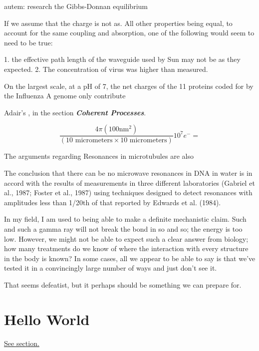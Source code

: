 \documentclass[paper.tex]{subfiles}
\begin{document}
\begin{autem}
	autem: research the Gibbs-Donnan equilibrium
\end{autem}









If we assume that the charge is not as. All other properties being equal, to account for the same coupling and absorption, one of the following would seem to need to be true:

1. the effective path length of the waveguide used by Sun may not be as they expected.
2. The concentration of virus was higher than measured.


On the largest scale, at a pH of 7, the net charges of the 11 proteins coded for by the Influenza A genome only contribute 







Adair's \cite{Vibrational2002}, in the section {\it \bf Coherent Processes}. 

$$\frac{4 \pi (100 \text{nm}^2)}{(10 \text{ micrometers} \times 10 \text{ micrometers})} 10^7 e^- = $$

The arguments regarding Resonances in microtubules are also 

\cite{Vibrational2002}
The conclusion that there can be no microwave resonances in DNA in water is in accord with the results of
measurements in three different laboratories (Gabriel et al.,
1987; Foster et al., 1987) using techniques designed to
detect resonances with amplitudes less than 1/20th of that
reported by Edwards et al. (1984).


In my field, I am used to being able to make a definite mechanistic claim. Such and such a gamma ray will not break the bond in so and so; the energy is too low. However, we might not be able to expect such a clear answer from biology; how many treatments do we know of where the interaction with every structure in the body is known? In some cases, all we appear to be able to say is that we've tested it in a convincingly large number of ways and just don't see it.

That seems defeatist, but it perhaps should be something we can prepare for.


\cite{Identification2018}



\section{Hello World}
\label{sec:hello}
\hyperref[sec:hello]{See section.}
\end{document}
